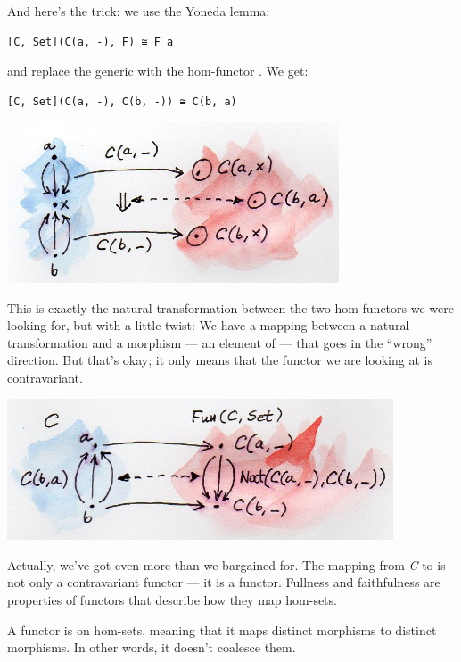 And here's the trick: we use the Yoneda lemma:

\begin{verbatim}
[C, Set](C(a, -), F) ≅ F a
\end{verbatim}

and replace the generic  with the hom-functor
. We get:

\begin{verbatim}
[C, Set](C(a, -), C(b, -)) ≅ C(b, a)
\end{verbatim}

\includegraphics[width=3.87500in]{images/yoneda-embedding.jpg}

This is exactly the natural transformation between the two hom-functors
we were looking for, but with a little twist: We have a mapping between
a natural transformation and a morphism --- an element of
 --- that goes in the ``wrong'' direction. But that's
okay; it only means that the functor we are looking at is contravariant.

\includegraphics[width=4.51042in]{images/yoneda-embedding-2.jpg}

Actually, we've got even more than we bargained for. The mapping from
\emph{C} to \code{{[}C,\ Set{]}} is not only a contravariant functor
--- it is a  functor. Fullness and faithfulness are
properties of functors that describe how they map hom-sets.

A  functor is  on hom-sets, meaning that
it maps distinct morphisms to distinct morphisms. In other words, it
doesn't coalesce them.


